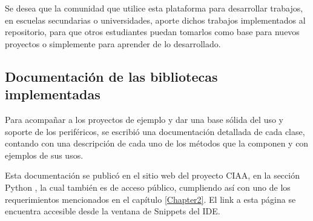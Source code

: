 Se desea que la comunidad que utilice esta plataforma para desarrollar trabajos, en escuelas secundarias o universidades, aporte dichos trabajos implementados al repositorio, para que otros estudiantes puedan tomarlos como base para nuevos proyectos o simplemente para aprender de lo desarrollado.

\subsection{Documentación de las bibliotecas implementadas} 

Para acompañar a los proyectos de ejemplo y dar una base sólida del uso y soporte de los periféricos, se escribió una documentación detallada de cada clase, contando con una descripción de cada uno de los métodos que la componen y con ejemplos de sus usos.

Esta documentación se publicó en el sitio web del proyecto CIAA, en la sección Python \cite{bibpython}, la cual también es de acceso público, cumpliendo así con uno de los requerimientos mencionados en el capítulo \ref{Chapter2}. El link a esta página se encuentra accesible desde la ventana de Snippets del IDE.







